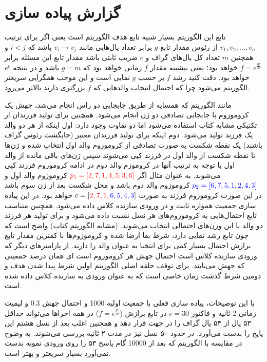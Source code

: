 \documentclass{article}
\newcommand{\code}[1]{\lr{\lstinline|#1|}}
\begin{document}
\section*{
گزارش پیاده سازی
}
تابع 
این الگوریتم بسیار شبیه تابع هدف الگوریتم
 است یعنی اگر برای ترتیب 
$v_1, v_2, \dots, v_n$
از رئوس مقدار تابع $g$ برابر تعداد یال‌هایی مانند
$v_i \rightarrow v_j$
باشد که $i < j$ و همچنین $m$ تعداد کل یال‌های گراف و $c$ ضریب ثابتی باشد مقدار تابع 
این مسئله برابر
$f = e^{\frac{gc}{m}}$
خواهد بود؛ یعنی بیشینه مقدار $f$ زمانی خواهد بود که 
$g = m$
باشد و در نتیجه
$e^c$
خواهد بود. دقت کنید رشد $f$ بر حسب $g$ نمایی است و این موجب همگرایی سریعتر الگوریتم می‌شود چرا که احتمال انتخاب والد‌هایی که $f$ بزرگتری دارند بالاتر می‌رود.

مانند الگوریتم
 که همسایه از طریق جابجایی دو راس انجام می‌شد، جهش یک کروموزوم با جابجایی تصادفی دو ژن انجام می‌شود. همچنین برای تولید فرزندان از تکنیکی مشابه کتاب استفاده می‌شود اما دو تفاوت وجود دارد: اول اینکه از هر دو والد یک فرزند تولید می‌شود. دوم اینکه برای تولید فرزندان معتبر (جایگشت رئوس گراف باشند) یک نقطه شکست به صورت تصادفی از کروموزوم والد اول انتخاب شده و ژن‌ها تا نقطه شکست از والد اول در فرزند کپی می‌شوند سپس ژن‌های باقی مانده از والد اول با توجه به ترتیب آنها در کروموزم والد دوم در ادامه کروموزوم فرزند کپی می‌شوند. به عنوان مثال اگر 
 $\textcolor{red}{p_1 = [2, 7, 1, 4, 5, 3, 6]}$
 کروموزوم والد اول و 
 $\textcolor{blue}{p_2 = [6, 7, 5, 1, 2, 4, 3]}$
 کروموزوم والد دوم باشد و محل شکست بعد از ژن سوم باشد در این صورت کروموزوم فرزند به صورت
 $c = [\textcolor{red}{2, 7, 1, } \, \textcolor{blue}{6, 5, 4, 3}]$
 خواهد بود. در این پیاده سازی جمعیت همواره ثابت و در ورودی سازنده کلاس 
 \code{GeneticAlgorithm}
 داده‌ می‌شود. همچنین متناسب تابع 
 احتمال‌هایی به کروموزوم‌های هر نسل نسبت داده می‌شود و برای تولید هر فرزند دو والد با این وزن‌های احتمالی انتخاب می‌شوند. (مشابه الگوریتم کتاب) واضح است که چون تابع 
  رشد نمایی دارد، شرط بقا ارضا شده و کروموزوم‌ها با کمترین مقدار تابع برازش احتمال بسیار کمی برای انتخبا به عنوان والد را دارند. از پارامترهای دیگر که ورودی سازنده کلاس 
   \code{GeneticAlgorithm}
   است احتمال جهش هر کروموزوم است ای همان درصد جمعیتی که جهش می‌یابند. برای توقف حلقه اصلی الگوریتم اولین شرط پیدا شدن هدف و دومین شرط گذشت زمان خاصی است که به عنوان ورودی به سازنده کلاس 
   \code{GeneticAlgorithm}
   داده شده است.
   
   با این توضیحات، پیاده سازی فعلی با جمعیت اولیه 1000 و احتمال جهش 
   $0.3$
   و لیمیت زمانی 2 ثانیه و فاکتور 
   $c = 30$
   در تابع برازش ($f = e^{\frac{gc}{m}}$) در همه اجرا‌ها می‌تواند حداقل ۵۳ یال از ۵۴ یال گراف را در جهت 
   قرار دهد و همچنین اغلب بعد از نسل هشتم این پایخ را بدست می‌آورد. در حدود ۵۰ نسل نیز در مدت ۲ ثانیه بررسی می‌شوند.
   به وضوح در مقایسه با الگوریتم
   که بعد از 10000 گام پاسخ ۵۳ را روی ورودی نمونه بدست نمی‌آورد بسیار سریعتر و بهتر است.
   
\end{document}
